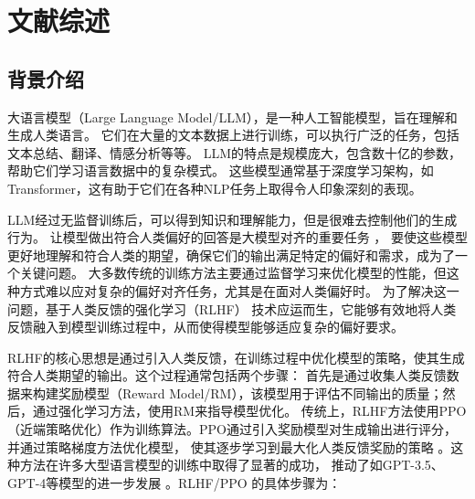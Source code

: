 \cleardoublepage
\newrefsection
\chapter{文献综述}

\section{背景介绍}


大语言模型（Large Language Model/LLM），是一种人工智能模型，旨在理解和生成人类语言。
它们在大量的文本数据上进行训练，可以执行广泛的任务，包括文本总结、翻译、情感分析等等。
LLM的特点是规模庞大，包含数十亿的参数，帮助它们学习语言数据中的复杂模式。
这些模型通常基于深度学习架构，如 Transformer，这有助于它们在各种NLP任务上取得令人印象深刻的表现。

LLM经过无监督训练后，可以得到知识和理解能力，但是很难去控制他们的生成行为。
让模型做出符合人类偏好的回答是大模型对齐的重要任务 \citep{Ouyang2022Training,Bai2022Training}，
要使这些模型更好地理解和符合人类的期望，确保它们的输出满足特定的偏好和需求，成为了一个关键问题。
大多数传统的训练方法主要通过监督学习来优化模型的性能，但这种方式难以应对复杂的偏好对齐任务，尤其是在面对人类偏好时。
为了解决这一问题，基于人类反馈的强化学习（RLHF）\citep{ziegler2019fine} 技术应运而生，它能够有效地将人类反馈融入到模型训练过程中，从而使得模型能够适应复杂的偏好要求。

RLHF的核心思想是通过引入人类反馈，在训练过程中优化模型的策略，使其生成符合人类期望的输出。这个过程通常包括两个步骤：
首先是通过收集人类反馈数据来构建奖励模型（Reward Model/RM），该模型用于评估不同输出的质量；然后，通过强化学习方法，使用RM来指导模型优化。
传统上，RLHF方法使用PPO（近端策略优化）作为训练算法。PPO通过引入奖励模型对生成输出进行评分，并通过策略梯度方法优化模型，
使其逐步学习到最大化人类反馈奖励的策略 \citep{ziegler2019pporlhf}。这种方法在许多大型语言模型的训练中取得了显著的成功，
推动了如GPT-3.5、GPT-4等模型的进一步发展 \citep{ouyang2022training, ye2023comprehensive}。RLHF/PPO 的具体步骤为：

